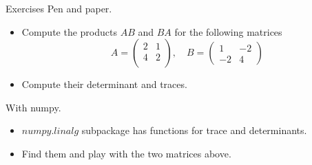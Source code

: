 \documentclass[8pt]{beamer}
\begin{document}
\begin{frame}{Exercises}
  Pen and paper.
  \begin{itemize}
  \item Compute the products $AB$ and $BA$ for the following matrices
    $$A =
    \begin{pmatrix}
      2 & 1\\
      4 & 2\\
    \end{pmatrix},\quad
    B =
    \begin{pmatrix}
      1 & -2\\
      -2 & 4
    \end{pmatrix}
    $$
  \item Compute their determinant and traces.
  \end{itemize}
  With numpy.
  \begin{itemize}
  \item  $numpy.linalg$ subpackage has functions for trace and determinants.
  \item Find them and play with the two matrices above.
  \end{itemize}
 
\end{frame}
\end{document}
